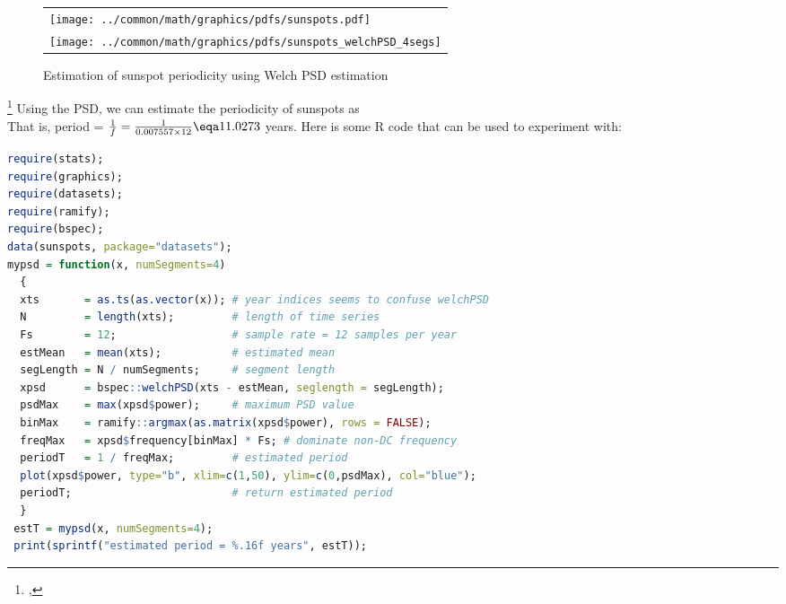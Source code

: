 \begin{figure}
  \centering
  \begin{tabular}{l}
    \texttt{[image: ../common/math/graphics/pdfs/sunspots.pdf]}\\
    \texttt{[image: ../common/math/graphics/pdfs/sunspots\_welchPSD\_4segs]}
  \end{tabular}
  \caption{Estimation of sunspot periodicity using Welch PSD estimation\label{fig:sunspot_welch}}
\end{figure}
\begin{example}
\footnote{
  ,
  }
Using the PSD, we can estimate the periodicity of sunspots  as
\\
That is, period = $\frac{1}{f}=\frac{1}{0.007557\times12}\eqa11.0273$ years.
Here is some R code that can be used to experiment with:
\begin{lstlisting}[language=R]
require(stats);
require(graphics);
require(datasets);
require(ramify);
require(bspec);
data(sunspots, package="datasets");
mypsd = function(x, numSegments=4) 
  {
  xts       = as.ts(as.vector(x)); # year indices seems to confuse welchPSD
  N         = length(xts);         # length of time series
  Fs        = 12;                  # sample rate = 12 samples per year
  estMean   = mean(xts);           # estimated mean
  segLength = N / numSegments;     # segment length
  xpsd      = bspec::welchPSD(xts - estMean, seglength = segLength);
  psdMax    = max(xpsd$power);     # maximum PSD value
  binMax    = ramify::argmax(as.matrix(xpsd$power), rows = FALSE);
  freqMax   = xpsd$frequency[binMax] * Fs; # dominate non-DC frequency
  periodT   = 1 / freqMax;         # estimated period
  plot(xpsd$power, type="b", xlim=c(1,50), ylim=c(0,psdMax), col="blue");
  periodT;                         # return estimated period
  }
 estT = mypsd(x, numSegments=4);
 print(sprintf("estimated period = %.16f years", estT));
\end{lstlisting}
\end{example}

